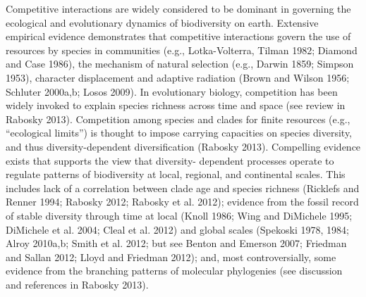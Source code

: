 \documentclass[12pt]{article}
\begin{document}
Competitive interactions are widely considered to be dominant in governing the
ecological and evolutionary dynamics of biodiversity on earth. Extensive
empirical evidence demonstrates that competitive interactions govern the use
of resources by species in communities (e.g., Lotka-Volterra, Tilman 1982;
Diamond and Case 1986), the mechanism of natural selection (e.g., Darwin 1859;
Simpson 1953), character displacement and adaptive radiation (Brown and Wilson
1956; Schluter 2000a,b; Losos 2009). In evolutionary biology, competition has
been widely invoked to explain species richness across time and space (see
review in Rabosky 2013). Competition among species and clades for finite
resources (e.g., “ecological limits”) is thought to impose carrying capacities
on species diversity, and thus diversity-dependent diversification (Rabosky
2013). Compelling evidence exists that supports the view that diversity-
dependent processes operate to regulate patterns of biodiversity at local,
regional, and continental scales. This includes lack of a correlation
between clade age and species richness (Ricklefs and Renner 1994;
Rabosky 2012; Rabosky et al. 2012); evidence from the fossil record of
stable diversity through time at local (Knoll 1986; Wing and
DiMichele 1995; DiMichele et al. 2004; Cleal et al. 2012) and global scales
(Spekoski 1978, 1984; Alroy 2010a,b; Smith et al. 2012; but see Benton and
Emerson 2007; Friedman and Sallan 2012; Lloyd and Friedman 2012); and,
most controversially, some evidence from the branching patterns of molecular
phylogenies (see discussion and references in Rabosky 2013).
\end{document}

